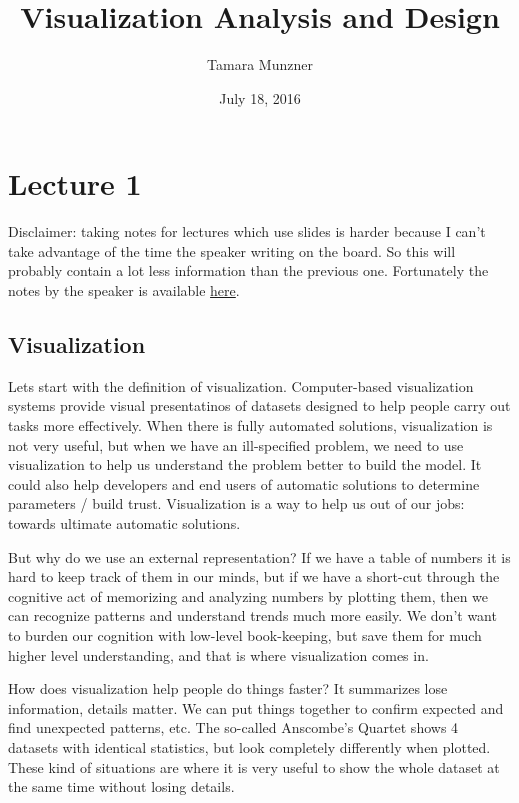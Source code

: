 \documentclass[letterpaper, 11pt]{article}
\numberwithin{equation}{section}
\numberwithin{figure}{section}
\begin{document}
\title{Visualization Analysis and Design}
\author{Tamara Munzner}
\date{July 18, 2016}

\maketitle

\section{Lecture 1}
\label{sec:lec1}

Disclaimer: taking notes for lectures which use slides is harder because I can't
take advantage of the time the speaker writing on the board. So this will
probably contain a lot less information than the previous one. Fortunately the
notes by the speaker is available
\href{http://www.cs.ubc.ca/~tmm/talks.html#vad16pitp}{here}.

\subsection{Visualization}

Lets start with the definition of visualization. Computer-based visualization
systems provide visual presentatinos of datasets designed to help people carry
out tasks more effectively. When there is fully automated solutions,
visualization is not very useful, but when we have an ill-specified problem, we
need to use visualization to help us understand the problem better to build the
model. It could also help developers and end users of automatic solutions to
determine parameters / build trust. Visualization is a way to help us out of our
jobs: towards ultimate automatic solutions.

But why do we use an external representation? If we have a table of numbers it
is hard to keep track of them in our minds, but if we have a short-cut through
the cognitive act of memorizing and analyzing numbers by plotting them, then we
can recognize patterns and understand trends much more easily. We don't want to
burden our cognition with low-level book-keeping, but save them for much higher
level understanding, and that is where visualization comes in.

How does visualization help people do things faster? It summarizes lose
information, details matter. We can put things together to confirm expected and
find unexpected patterns, etc. The so-called Anscombe's Quartet shows 4 datasets
with identical statistics, but look completely differently when plotted. These
kind of situations are where it is very useful to show the whole dataset at the
same time without losing details.
\end{document}
